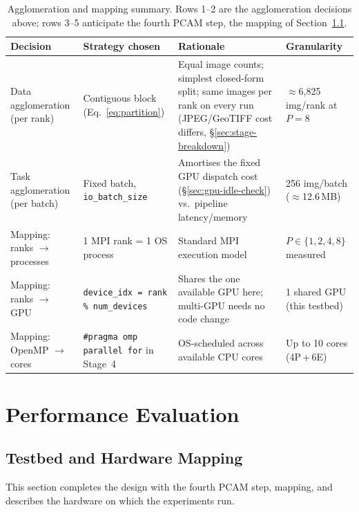 \documentclass[a4paper,12pt]{report}
\begin{document}
\begin{table}[H]
\centering
\caption{Agglomeration and mapping summary. Rows 1--2 are the
agglomeration decisions above; rows 3--5 anticipate the fourth PCAM
step, the mapping of Section~\ref{sec:mapping}.}
\label{tab:agglomeration-mapping}
\begin{tabular}{@{}p{2.9cm}p{3.6cm}p{4.3cm}p{2.3cm}@{}}
\toprule
\textbf{Decision} & \textbf{Strategy chosen} & \textbf{Rationale} &
\textbf{Granularity} \\
\midrule
Data agglomeration (per rank) &
  Contiguous block (Eq.~\eqref{eq:partition}) &
  Equal image counts; simplest closed-form split; same images per rank
  on every run (JPEG/GeoTIFF cost differs, \S\ref{sec:stage-breakdown}) &
  $\approx$6,825 img/rank at $P{=}8$ \\[4pt]
Task agglomeration (per batch) &
  Fixed batch, \texttt{io\_\discretionary{}{}{}batch\_\discretionary{}{}{}size} &
  Amortises the fixed GPU dispatch cost (\S\ref{sec:gpu-idle-check}) vs.\
  pipeline latency/memory &
  256 img/batch ($\approx$12.6\,MB) \\[4pt]
Mapping: ranks $\to$ processes &
  1 MPI rank = 1 OS process &
  Standard MPI execution model &
  $P\in\{1,2,4,8\}$ measured \\[4pt]
Mapping: ranks $\to$ GPU &
  \texttt{device\_\discretionary{}{}{}idx = rank \% num\_\discretionary{}{}{}devices} &
  Shares the one available GPU here; multi-GPU needs no code change &
  1 shared GPU (this testbed) \\[4pt]
Mapping: OpenMP $\to$ cores &
  \texttt{\#pragma omp parallel for} in Stage~4 &
  OS-scheduled across available CPU cores &
  Up to 10 cores (4P\,+\,6E) \\
\bottomrule
\end{tabular}
\end{table}

\chapter{Performance Evaluation}
\label{chap:perf}

\section{Testbed and Hardware Mapping}
\label{sec:mapping}

This section completes the design with the fourth PCAM step, mapping, and describes
the hardware on which the experiments run.
\end{document}
